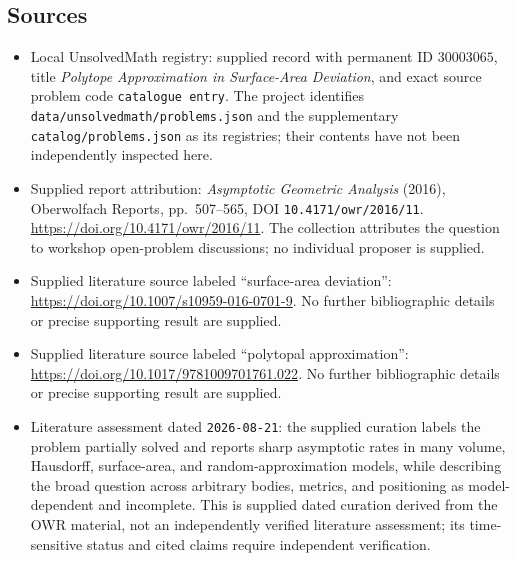 \documentclass[11pt]{article}
\begin{document}
\subsection{Sources}
\begin{itemize}
\item Local UnsolvedMath registry: supplied record with permanent ID \(30003065\), title \emph{Polytope Approximation in Surface-Area Deviation}, and exact source problem code \texttt{catalogue entry}. The project identifies \texttt{data/unsolvedmath/problems.json} and the supplementary \texttt{catalog/problems.json} as its registries; their contents have not been independently inspected here.
\item Supplied report attribution: \emph{Asymptotic Geometric Analysis} (2016), Oberwolfach Reports, pp.~507--565, DOI \texttt{10.4171/owr/2016/11}. \url{https://doi.org/10.4171/owr/2016/11}. The collection attributes the question to workshop open-problem discussions; no individual proposer is supplied.
\item Supplied literature source labeled ``surface-area deviation'': \url{https://doi.org/10.1007/s10959-016-0701-9}. No further bibliographic details or precise supporting result are supplied.
\item Supplied literature source labeled ``polytopal approximation'': \url{https://doi.org/10.1017/9781009701761.022}. No further bibliographic details or precise supporting result are supplied.
\item Literature assessment dated \texttt{2026-08-21}: the supplied curation labels the problem partially solved and reports sharp asymptotic rates in many volume, Hausdorff, surface-area, and random-approximation models, while describing the broad question across arbitrary bodies, metrics, and positioning as model-dependent and incomplete. This is supplied dated curation derived from the OWR material, not an independently verified literature assessment; its time-sensitive status and cited claims require independent verification.
\end{itemize}
\end{document}
